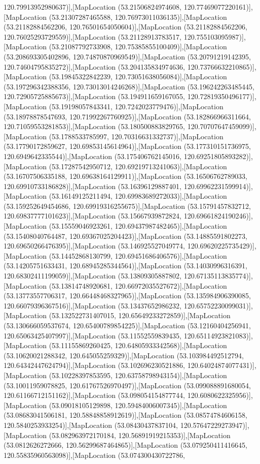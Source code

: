 120.79913952980637)],[MapLocation (53.21506824974608, 120.77469077220161)],[MapLocation (53.21307287465588, 120.76973011036135)],[MapLocation (53.21182884562206, 120.76501654050604)],[MapLocation (53.21182884562206, 120.76025293729559)],[MapLocation (53.21128913783517, 120.755103095987)],[MapLocation (53.21087792733908, 120.75385855100409)],[MapLocation (53.208693305402896, 120.74870870969549)],[MapLocation (53.20791219142395, 120.74604795835272)],[MapLocation (53.204135834974636, 120.73766632210865)],[MapLocation (53.19845322842239, 120.73051638056084)],[MapLocation (53.197296342388356, 120.73013014246268)],[MapLocation (53.196242263485445, 120.72905725885673)],[MapLocation (53.194911659167055, 120.72819350496177)],[MapLocation (53.19198057843341, 120.7242023779476)],[MapLocation (53.18978878547693, 120.71992267760925)],[MapLocation (53.182866966311664, 120.71059553281853)],[MapLocation (53.180500883829765, 120.70707647459099)],[MapLocation (53.1788533785997, 120.70316631332737)],[MapLocation (53.17790172859627, 120.69853145614964)],[MapLocation (53.177310151736975, 120.6949642335544)],[MapLocation (53.175406762145016, 120.69251805893282)],[MapLocation (53.17287542950712, 120.69219713241063)],[MapLocation (53.16707506335188, 120.69638164129911)],[MapLocation (53.16506762789033, 120.69910733186828)],[MapLocation (53.16396129887401, 120.69962231599914)],[MapLocation (53.16149125211494, 120.69983689272033)],[MapLocation (53.159252649454686, 120.69919316255675)],[MapLocation (53.15791457832712, 120.69837777101623)],[MapLocation (53.15667939872824, 120.69661824190246)],[MapLocation (53.15559046923261, 120.69437987482465)],[MapLocation (53.15408040764487, 120.69367025204423)],[MapLocation (53.14885591802273, 120.69650266476395)],[MapLocation (53.146925527049774, 120.69620225735429)],[MapLocation (53.14452868130799, 120.69451686406576)],[MapLocation (53.14205751633431, 120.68945285344564)],[MapLocation (53.14030996316391, 120.68302411199059)],[MapLocation (53.13809305887802, 120.67135113835774)],[MapLocation (53.13814748920681, 120.66972035527672)],[MapLocation (53.13773557706317, 120.66448468327965)],[MapLocation (53.135984906390085, 120.66079396367516)],[MapLocation (53.13437652986232, 120.65752230099031)],[MapLocation (53.132522731407015, 120.65649233272859)],[MapLocation (53.130666059537674, 120.65400789854225)],[MapLocation (53.12160404256941, 120.65063425407997)],[MapLocation (53.11552559839435, 120.65114923821083)],[MapLocation (53.11155869260425, 120.64805933342568)],[MapLocation (53.10620021288342, 120.645055259329)],[MapLocation (53.103984492512794, 120.64342447624794)],[MapLocation (53.102696230521886, 120.64024874077431)],[MapLocation (53.10228397853595, 120.63758798943154)],[MapLocation (53.10011959078825, 120.61767526970497)],[MapLocation (53.099088891680054, 120.61166712151162)],[MapLocation (53.098054154877744, 120.6080622325956)],[MapLocation (53.09018105129898, 120.59484006007345)],[MapLocation (53.08683041506181, 120.58848858912619)],[MapLocation (53.08574784606158, 120.5840253933254)],[MapLocation (53.08430437837104, 120.57647229273947)],[MapLocation (53.082963972170184, 120.56891919215353)],[MapLocation (53.0812626272666, 120.56299687464865)],[MapLocation (53.079250411416645, 120.55835960563098)],[MapLocation (53.074300430722786, 